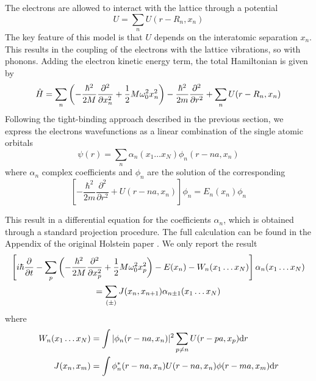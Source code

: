 The electrons are allowed to interact with the lattice through a potential
\begin{equation}
    U = \sum_n U(r-R_n, x_n)
\end{equation} The key feature of this model is that $U$ depends on the interatomic separation $x_n$. This results in the coupling of the electrons with the lattice vibrations, so with phonons. Adding the electron kinetic energy term, the total Hamiltonian is given by
\begin{equation}
    \hat{H} = \sum_n \left( -\frac{\hbar^2}{2M} \frac{\partial^2}{\partial x_n^2} + \frac{1}{2} M\omega_0^2x_n^2 \right)
    -\frac{\hbar^2}{2m} \frac{\partial^2}{\partial r^2}
    +     \sum_n U(r-R_n, x_n)
\end{equation}
Following the tight-binding approach described in the previous section, we express the electrons wavefunctions as a linear combination of the single atomic orbitals
\begin{equation}
    \psi(r) = \sum_{n} \alpha_{n}(x_1 \dots x_N) \phi_n(r-na, x_n)
\end{equation}
where $\alpha_n$ complex coefficients and $\phi_n$ are the solution of the corresponding \sche
\begin{equation}
    \left[ -\frac{\hbar^2}{2m} \frac{\partial^2}{\partial r^2} + U(r-na, x_n) \right] \phi_n = E_n(x_n) \phi_n
\end{equation}

This result in a differential equation for the coefficients $\alpha_n$, which is obtained through a standard projection procedure. The full calculation can be found in the Appendix of the original Holstein paper \cite{holstein1959}. We only report the result
\begin{multline} \label{eq:holstein_diff}
    \left[ i\hbar \pdv{}{t} - \sum_p \left( -\frac{\hbar^2}{2M} \pdv[2]{}{x_p} + \frac{1}{2} M \omega_0^2 x_p^2 \right) - E(x_n) - W_n(x_1\dots x_N) \right] \alpha_n(x_1\dots x_N)
    \\= \sum_{(\pm)} J(x_n, x_{n+1}) \alpha_{n\pm1}(x_1\dots x_N)
\end{multline}
where
\begin{align}
    W_n(x_1 \dots x_N) & = \int |\phi_n(r-na, x_n)|^2  \sum_{p \neq n} U(r-pa, x_p)  \differential r \\
    J(x_n, x_m)        & = \int \phi_n^*(r-na, x_n) U(r-na, x_n) \phi(r-ma, x_m) \differential r
\end{align}

